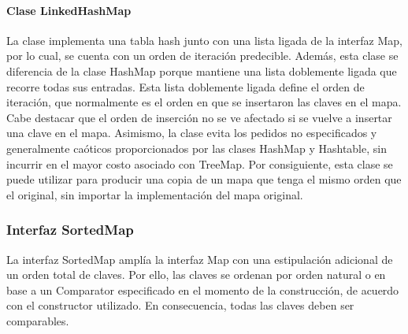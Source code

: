 \documentclass{report}
\begin{document}
\paragraph{Clase LinkedHashMap}
La clase implementa una tabla hash junto con una lista ligada de la interfaz Map, por lo cual, se cuenta con un orden de iteración predecible. Además, esta clase se diferencia de la clase HashMap porque mantiene una lista doblemente ligada que recorre todas sus entradas. Esta lista doblemente ligada define el orden de iteración, que normalmente es el orden en que se insertaron las claves en el mapa. Cabe destacar que el orden de inserción no se ve afectado si se vuelve a insertar una clave en el mapa.
Asimismo, la clase evita los pedidos no especificados y generalmente caóticos proporcionados por las clases HashMap y Hashtable, sin incurrir en el mayor costo asociado con TreeMap. Por consiguiente, esta clase se puede utilizar para producir una copia de un mapa que tenga el mismo orden que el original, sin importar la implementación del mapa original.
\subsubsection{Interfaz SortedMap}
La interfaz SortedMap amplía la interfaz Map con una estipulación adicional de un orden total de claves. Por ello, las claves se ordenan por orden natural o en base a un Comparator especificado en el momento de la construcción, de acuerdo con el constructor utilizado. En consecuencia, todas las claves deben ser comparables.
\end{document}
